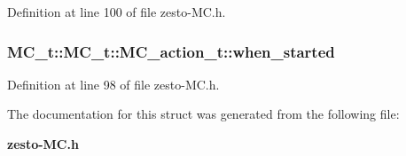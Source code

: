 Definition at line 100 of file zesto-MC.h.
\subsubsection[{when\_\-started}]{ MC\_\-t::MC\_\-t::MC\_\-action\_\-t::when\_\-started}\label{structMC__t_1_1MC__action__t_80715922c115049d78d1288042d52d61}




Definition at line 98 of file zesto-MC.h.

The documentation for this struct was generated from the following file:\begin{CompactItemize}
\item 
{\bf zesto-MC.h}\end{CompactItemize}
